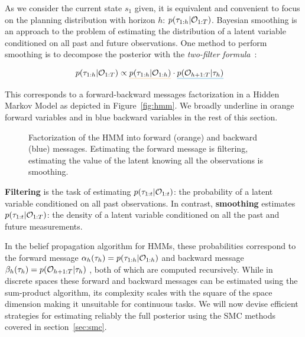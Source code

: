 As we consider the current state $s_1$ given, it is equivalent and convenient to focus on the planning distribution with horizon $h$: $p(\tau_{1:h}|{\mathcal{O}}_{1:T})$. Bayesian smoothing is an approach to the problem of estimating the distribution of a latent variable conditioned on all past and future observations. One method to perform smoothing is to decompose the posterior with the \textit{two-filter formula}~\citep{bresler1986two, kitagawa1994two}:


\begin{align}
\label{eq:forwardbackward}
    {p(\traj_{1:h} | \gO_{1:T})} & \propto \mathunderline{alpha}{p(\traj_{1:h}|\gO_{1:h})} \cdot \mathunderline{beta}{p(\gO_{h+1:T}|\traj_{h})}
\end{align}





\noindent This corresponds to a forward-backward messages factorization in a Hidden Markov Model as depicted in Figure~\ref{fig:hmm}. We broadly underline in orange forward variables and in blue backward variables in the rest of this section.




\setlength{\wrapoverhang}{\marginparwidth}
\addtolength{\wrapoverhang}{\marginparsep}
\begin{figure}%
\centering
\resizebox{.95\linewidth}{!}{

}
\caption{Factorization of the HMM into  {\color{alpha} forward} (orange) and {\color{beta} backward} (blue) messages. Estimating the forward message is filtering, estimating the value of the latent knowing all the observations is smoothing.}
\label{fig:alphabeta}
\end{figure}

\textbf{Filtering} is the task of estimating $p(\tau_{1:t} | {\mathcal{O}}_{1:t})$: the probability of a latent variable conditioned on all past observations. In contrast, \textbf{smoothing} estimates $p(\tau_{1:t} | {\mathcal{O}}_{1:T})$: the density of a latent variable conditioned on all the past and future measurements. 

In the belief propagation algorithm for HMMs, these probabilities correspond to the forward message $\alpha_{h}(\tau_{h}) = p(\tau_{1:h}|{\mathcal{O}}_{1:h})$ and backward message $\beta_{h}(\tau_{h}) = {p({\mathcal{O}}_{h+1:T}|\tau_{h})}$ , both of which are computed recursively.
While in discrete spaces these forward and backward messages can be estimated using the sum-product algorithm, its complexity scales with the square of the space dimension making it unsuitable for continuous tasks. We will now devise efficient strategies for estimating reliably the full posterior using the SMC methods covered in section~\ref{sec:smc}.



